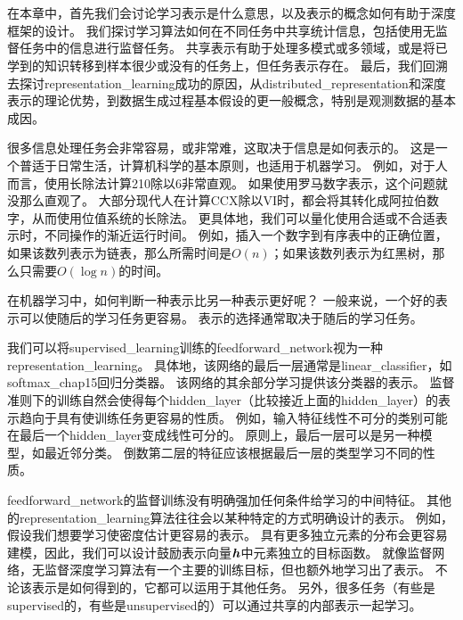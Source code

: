 \chapter{}
\label{chap:representation_learning}
在本章中，首先我们会讨论学习表示是什么意思，以及表示的概念如何有助于深度框架的设计。
我们探讨学习算法如何在不同任务中共享统计信息，包括使用无监督任务中的信息进行监督任务。
共享表示有助于处理多模式或多领域，或是将已学到的知识转移到样本很少或没有的任务上，但任务表示存在。
最后，我们回溯去探讨\gls{representation_learning}成功的原因，从\gls{distributed_representation}\citep{Hinton-et-al-PDP1986}和深度表示的理论优势，到数据生成过程基本假设的更一般概念，特别是观测数据的基本成因。


很多信息处理任务会非常容易，或非常难，这取决于信息是如何表示的。
这是一个普适于日常生活，计算机科学的基本原则，也适用于机器学习。
例如，对于人而言，使用长除法计算210除以6非常直观。
如果使用罗马数字表示，这个问题就没那么直观了。
大部分现代人在计算CCX除以VI时，都会将其转化成阿拉伯数字，从而使用位值系统的长除法。
更具体地，我们可以量化使用合适或不合适表示时，不同操作的渐近运行时间。
例如，插入一个数字到有序表中的正确位置，如果该数列表示为链表，那么所需时间是$O(n)$；如果该数列表示为红黑树，那么只需要$O(\log n)$的时间。


在机器学习中，如何判断一种表示比另一种表示更好呢？
一般来说，一个好的表示可以使随后的学习任务更容易。
表示的选择通常取决于随后的学习任务。


我们可以将\gls{supervised_learning}训练的\gls{feedforward_network}视为一种\gls{representation_learning}。
具体地，该网络的最后一层通常是\gls{linear_classifier}，如\gls{softmax_chap15}回归分类器。
该网络的其余部分学习提供该分类器的表示。
监督准则下的训练自然会使得每个\gls{hidden_layer}（比较接近上面的\gls{hidden_layer}）的表示趋向于具有使训练任务更容易的性质。
例如，输入特征线性不可分的类别可能在最后一个\gls{hidden_layer}变成线性可分的。
原则上，最后一层可以是另一种模型，如最近邻分类\citep{SalakhutdinovR2007-small}。
倒数第二层的特征应该根据最后一层的类型学习不同的性质。


\gls{feedforward_network}的监督训练没有明确强加任何条件给学习的中间特征。
其他的\gls{representation_learning}算法往往会以某种特定的方式明确设计的表示。
例如，假设我们想要学习使密度估计更容易的表示。
具有更多独立元素的分布会更容易建模，因此，我们可以设计鼓励表示向量$\boldsymbol{\mathit{h}}$中元素独立的目标函数。
就像监督网络，无监督深度学习算法有一个主要的训练目标，但也额外地学习出了表示。
不论该表示是如何得到的，它都可以运用于其他任务。
另外，很多任务（有些是\gls{supervised}的，有些是\gls{unsupervised}的）可以通过共享的内部表示一起学习。


